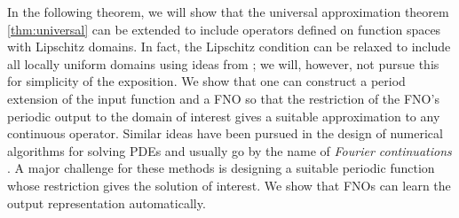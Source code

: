 \documentclass[reqno,a4paper]{amsart}
\begin{document}
In the following theorem, we will show that the universal approximation theorem \ref{thm:universal} can be extended to include operators defined on function spaces with Lipschitz domains. In fact, the Lipschitz condition can be relaxed to include all locally uniform domains using ideas from \cite{rogers2006degree}; we will, however, not pursue this for simplicity of the exposition. We show that one can construct a period extension of the input function and a FNO so that the restriction of the FNO's periodic output to the domain of interest gives a suitable approximation to any continuous operator. Similar ideas have been pursued in the design of numerical algorithms for solving PDEs and usually go by the name of \textit{Fourier continuations} \cite{bruno2010highorder1,bruno2010highorder2}. A major challenge for these methods is designing a suitable periodic function whose restriction gives the solution of interest. We show that FNOs can learn the output representation automatically.
\end{document}
